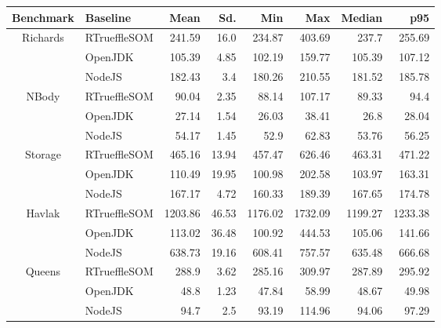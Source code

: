 \begin{center}
\begin{tabular}{ c | l r r r r r r}
\toprule
\textbf{Benchmark} & \textbf{Baseline} & \textbf{Mean} & \textbf{Sd.} & \textbf{Min} & \textbf{Max} & \textbf{Median} & \textbf{p95}\\
\toprule

\multirow{3}{*}{ Richards } & RTrueffleSOM & 241.59 & 16.0 & 234.87 & 403.69 & 237.7 & 255.69 \\
& OpenJDK & 105.39 & 4.85 & 102.19 & 159.77 & 105.39 & 107.12 \\
& NodeJS & 182.43 & 3.4 & 180.26 & 210.55 & 181.52 & 185.78 \\
\midrule

\multirow{3}{*}{ NBody } & RTrueffleSOM & 90.04 & 2.35 & 88.14 & 107.17 & 89.33 & 94.4 \\
& OpenJDK & 27.14 & 1.54 & 26.03 & 38.41 & 26.8 & 28.04 \\
& NodeJS & 54.17 & 1.45 & 52.9 & 62.83 & 53.76 & 56.25 \\
\midrule

\multirow{3}{*}{ Storage } & RTrueffleSOM & 465.16 & 13.94 & 457.47 & 626.46 & 463.31 & 471.22 \\
& OpenJDK & 110.49 & 19.95 & 100.98 & 202.58 & 103.97 & 163.31 \\
& NodeJS & 167.17 & 4.72 & 160.33 & 189.39 & 167.65 & 174.78 \\
\midrule

\multirow{3}{*}{ Havlak } & RTrueffleSOM & 1203.86 & 46.53 & 1176.02 & 1732.09 & 1199.27 & 1233.38 \\
& OpenJDK & 113.02 & 36.48 & 100.92 & 444.53 & 105.06 & 141.66 \\
& NodeJS & 638.73 & 19.16 & 608.41 & 757.57 & 635.48 & 666.68 \\
\midrule

\multirow{3}{*}{ Queens } & RTrueffleSOM & 288.9 & 3.62 & 285.16 & 309.97 & 287.89 & 295.92 \\
& OpenJDK & 48.8 & 1.23 & 47.84 & 58.99 & 48.67 & 49.98 \\
& NodeJS & 94.7 & 2.5 & 93.19 & 114.96 & 94.06 & 97.29 \\
\midrule

\end{tabular}
\end{center}